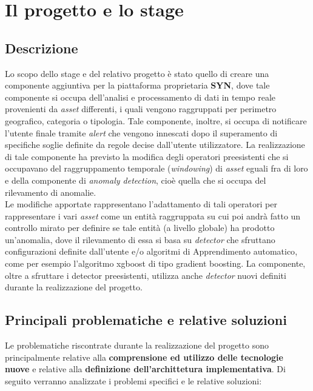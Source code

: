 \section{Il progetto e lo stage}

\subsection{Descrizione}

Lo scopo dello stage e del relativo progetto è stato quello di creare una componente aggiuntiva per la piattaforma proprietaria \textbf{SYN}, dove tale componente si occupa dell'analisi e processamento di dati in tempo reale provenienti da \textit{asset} differenti, i quali vengono raggruppati per perimetro geografico, categoria o tipologia. Tale componente, inoltre,
si occupa di notificare l'utente finale tramite \textit{alert} che vengono innescati dopo il superamento di specifiche soglie definite da regole decise dall'utente utilizzatore.
La realizzazione di tale componente ha previsto la modifica degli operatori preesistenti che si occupavano del raggruppamento temporale (\textit{windowing}) di \textit{asset} eguali fra di loro e della componente di \textit{anomaly detection}, cioè quella che si occupa del rilevamento di anomalie.\\
Le modifiche apportate rappresentano l'adattamento di tali operatori per rappresentare i vari \textit{asset} come un entità raggruppata su cui poi andrà fatto un controllo mirato per definire se tale entità (a livello globale) ha prodotto un'anomalia, dove il rilevamento di essa si basa su \textit{detector} che sfruttano configurazioni definite dall'utente e/o algoritmi di \gls{Apprendimento automatico}, come per esempio l'algoritmo \gls{xgboost} di tipo \gls{gradient boosting}. La componente, oltre a sfruttare i detector preesistenti, utilizza anche \textit{detector} nuovi definiti durante la realizzazione del progetto.


\subsection{Principali problematiche e relative soluzioni}
Le problematiche riscontrate durante la realizzazione del progetto sono principalmente relative alla \textbf{comprensione ed utilizzo delle tecnologie nuove} e relative alla \textbf{definizione dell'archittetura implementativa}. Di seguito verranno analizzate i problemi specifici e le relative soluzioni:\\

